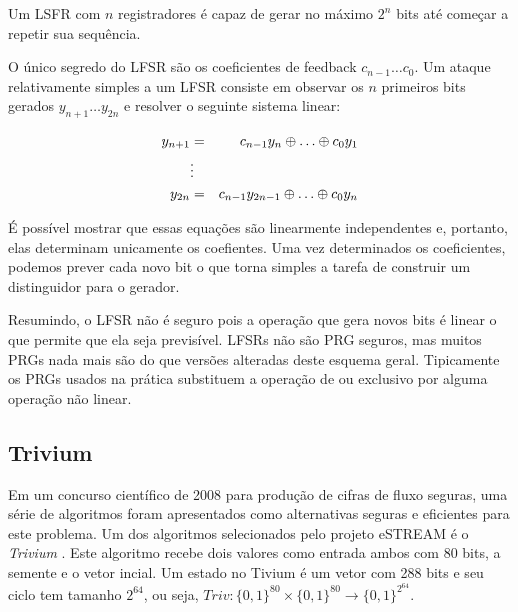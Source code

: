 Um LSFR com $n$ registradores é capaz de gerar no máximo $2^n$ bits até começar a repetir sua sequência.

O único segredo do LFSR são os coeficientes de feedback $c_{n-1} \dots c_0$.
Um ataque relativamente simples a um LFSR consiste em observar os $n$ primeiros bits gerados $y_{n+1} \dots y_{2n}$ e resolver o seguinte sistema linear:

\begin{eqnarray*}
  y_{n+1} &    =   & c_{n-1}y_n \xor \dots \xor c_0 y_1\\
         & \vdots &  \\
  y_{2n}  &    =   & c_{n-1}y_{2n-1} \xor \dots \xor c_0 y_n\\      
\end{eqnarray*}

É possível mostrar que essas equações são linearmente independentes e, portanto, elas determinam unicamente os coefientes.
Uma vez determinados os coeficientes, podemos prever cada novo bit o que torna simples a tarefa de construir um distinguidor para o gerador.

Resumindo, o LFSR não é seguro pois a operação que gera novos bits é linear o que permite que ela seja previsível.
LFSRs não são PRG seguros, mas muitos PRGs nada mais são do que versões alteradas deste esquema geral.
Tipicamente os PRGs usados na prática substituem a operação de ou exclusivo por alguma operação não linear.

\subsection{Trivium}
\label{sec:trivium}

Em um concurso científico de 2008 para produção de cifras de fluxo seguras, uma série de algoritmos foram apresentados como alternativas seguras e eficientes para este problema.
Um dos algoritmos selecionados pelo projeto eSTREAM é o {\em Trivium} \cite{DeCanniere06}.
Este algoritmo recebe dois valores como entrada ambos com 80 bits, a semente e o vetor incial.
Um estado no Tivium é um vetor com 288 bits e seu ciclo tem tamanho $2^{64}$, ou seja, $Triv: \{0,1\}^{80}\times \{0,1\}^{80} \to \{0,1\}^{2^{64}}$.


